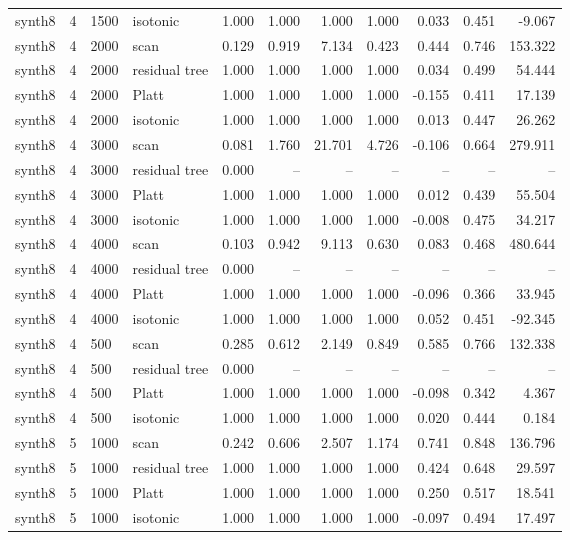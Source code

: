 \begin{tabular}{lrllrrrrrrr}
synth8 & 4 & 1500 & isotonic & 1.000 & 1.000 & 1.000 & 1.000 & 0.033 & 0.451 & -9.067 \\
synth8 & 4 & 2000 & scan & 0.129 & 0.919 & 7.134 & 0.423 & 0.444 & 0.746 & 153.322 \\
synth8 & 4 & 2000 & residual tree & 1.000 & 1.000 & 1.000 & 1.000 & 0.034 & 0.499 & 54.444 \\
synth8 & 4 & 2000 & Platt & 1.000 & 1.000 & 1.000 & 1.000 & -0.155 & 0.411 & 17.139 \\
synth8 & 4 & 2000 & isotonic & 1.000 & 1.000 & 1.000 & 1.000 & 0.013 & 0.447 & 26.262 \\
synth8 & 4 & 3000 & scan & 0.081 & 1.760 & 21.701 & 4.726 & -0.106 & 0.664 & 279.911 \\
synth8 & 4 & 3000 & residual tree & 0.000 & -- & -- & -- & -- & -- & -- \\
synth8 & 4 & 3000 & Platt & 1.000 & 1.000 & 1.000 & 1.000 & 0.012 & 0.439 & 55.504 \\
synth8 & 4 & 3000 & isotonic & 1.000 & 1.000 & 1.000 & 1.000 & -0.008 & 0.475 & 34.217 \\
synth8 & 4 & 4000 & scan & 0.103 & 0.942 & 9.113 & 0.630 & 0.083 & 0.468 & 480.644 \\
synth8 & 4 & 4000 & residual tree & 0.000 & -- & -- & -- & -- & -- & -- \\
synth8 & 4 & 4000 & Platt & 1.000 & 1.000 & 1.000 & 1.000 & -0.096 & 0.366 & 33.945 \\
synth8 & 4 & 4000 & isotonic & 1.000 & 1.000 & 1.000 & 1.000 & 0.052 & 0.451 & -92.345 \\
synth8 & 4 & 500 & scan & 0.285 & 0.612 & 2.149 & 0.849 & 0.585 & 0.766 & 132.338 \\
synth8 & 4 & 500 & residual tree & 0.000 & -- & -- & -- & -- & -- & -- \\
synth8 & 4 & 500 & Platt & 1.000 & 1.000 & 1.000 & 1.000 & -0.098 & 0.342 & 4.367 \\
synth8 & 4 & 500 & isotonic & 1.000 & 1.000 & 1.000 & 1.000 & 0.020 & 0.444 & 0.184 \\
synth8 & 5 & 1000 & scan & 0.242 & 0.606 & 2.507 & 1.174 & 0.741 & 0.848 & 136.796 \\
synth8 & 5 & 1000 & residual tree & 1.000 & 1.000 & 1.000 & 1.000 & 0.424 & 0.648 & 29.597 \\
synth8 & 5 & 1000 & Platt & 1.000 & 1.000 & 1.000 & 1.000 & 0.250 & 0.517 & 18.541 \\
synth8 & 5 & 1000 & isotonic & 1.000 & 1.000 & 1.000 & 1.000 & -0.097 & 0.494 & 17.497 \\

\end{tabular}
